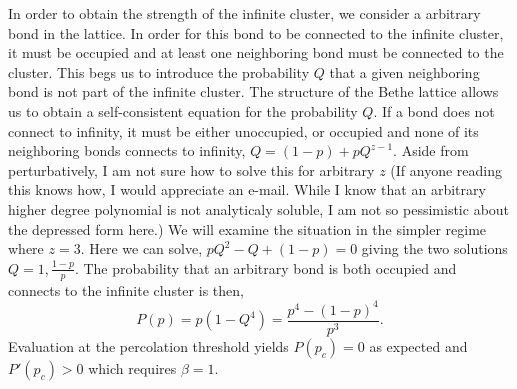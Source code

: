 In order to obtain the strength of the infinite cluster, we consider a arbitrary
bond in the lattice.  In order for this bond to be connected to the infinite
cluster, it must be occupied and at least one neighboring bond must be connected
to the cluster.  This begs us to introduce the probability $Q$ that a given neighboring
bond is not part of the infinite cluster.  The structure of the Bethe lattice allows us
to obtain a self-consistent equation for the probability $Q$.  If a bond does not
connect to infinity, it must be either unoccupied, or occupied and none of its
neighboring bonds connects to infinity, $Q = (1-p) + pQ^{z-1}$.  Aside from
perturbatively, I am not sure how to solve this for arbitrary $z$ (If anyone
reading this knows how, I would appreciate an e-mail. While I know that an arbitrary
higher degree polynomial is not analyticaly soluble, I am not so pessimistic about
the depressed form here.)  We will examine the situation in the
simpler regime where $z=3$.  Here we can solve, $pQ^2 - Q + (1-p) = 0$ giving the
two solutions $Q=1, \frac{1-p}{p}$. The probability that an arbitrary bond is both
occupied and connects to the infinite cluster is then,
\[P(p) = p(1-Q^4) = \frac{p^4-(1-p)^4}{p^3}.\]
Evaluation at the percolation threshold yields $P(p_c) = 0$ as expected and
$P'(p_c)>0$ which requires $\beta=1$.


